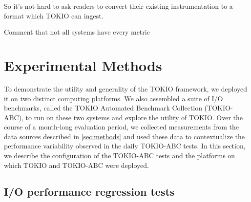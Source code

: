 So it's not hard to ask readers to convert their existing instrumentation to a format which TOKIO can ingest.

Comment that not all systems have every metric

\section{Experimental Methods} \label{sec:platforms}

To demonstrate the utility and generality of the TOKIO framework, we deployed it on two distinct computing platforms.
We also assembled a suite of I/O benchmarks, called the TOKIO Automated Benchmark Collection (TOKIO-ABC), to run on these two systems and explore the utility of TOKIO.  
Over the course of a month-long evaluation period, we collected measurements from the data sources described in \ref{sec:methods} and used these data to contextualize the performance variability observed in the daily TOKIO-ABC tests.
In this section, we describe the configuration of the TOKIO-ABC tests and the platforms on which TOKIO and TOKIO-ABC were deployed.

\subsection{I/O performance regression tests} \label{sec:methods/tests}


